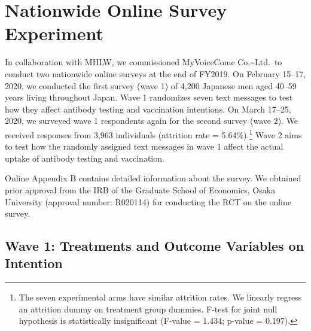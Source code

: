 \documentclass[
]{article}
\begin{document}
\hypertarget{experiment}{%
\section{Nationwide Online Survey Experiment}\label{experiment}}

In collaboration with MHLW, we commissioned MyVoiceCome Co.\textasciitilde Ltd.~to conduct two nationwide online surveys at the end of FY2019. On February 15--17, 2020, we conducted the first survey (wave 1) of 4,200 Japanese men aged 40--59 years living throughout Japan. Wave 1 randomizes seven text messages to test how they affect antibody testing and vaccination intentions.
On March 17--25, 2020, we surveyed wave 1 respondents again for the second survey (wave 2). We received responses from 3,963 individuals (attrition rate = 5.64\%).\footnote{The seven experimental arms have similar attrition rates. We linearly regress an attrition dummy on treatment group dummies. F-test for joint null hypothesis is statistically insignificant (F-value = $1.434$; p-value = $0.197$).} Wave 2 aims to test how the randomly assigned text messages in wave 1 affect the actual uptake of antibody testing and vaccination.

Online Appendix B contains detailed information about the survey. We obtained prior approval from the IRB of the Graduate School of Economics, Osaka University (approval number: R020114) for conducting the RCT on the online survey.

\hypertarget{wave1}{%
\subsection{Wave 1: Treatments and Outcome Variables on Intention}\label{wave1}}
\end{document}
